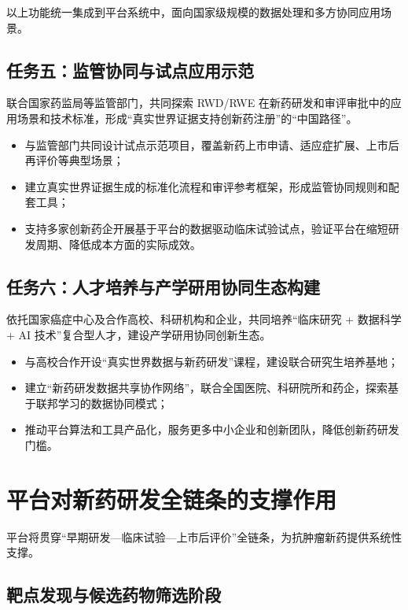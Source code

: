 \documentclass[12pt, a4paper, fontset=mac]{ctexart} %
\begin{document}
以上功能统一集成到平台系统中，面向国家级规模的数据处理和多方协同应用场景。

\subsection*{任务五：监管协同与试点应用示范}

联合国家药监局等监管部门，共同探索 RWD/RWE 在新药研发和审评审批中的应用场景和技术标准，形成“真实世界证据支持创新药注册”的“中国路径”。

\begin{itemize}
  \item 与监管部门共同设计试点示范项目，覆盖新药上市申请、适应症扩展、上市后再评价等典型场景；
  \item 建立真实世界证据生成的标准化流程和审评参考框架，形成监管协同规则和配套工具；
  \item 支持多家创新药企开展基于平台的数据驱动临床试验试点，验证平台在缩短研发周期、降低成本方面的实际成效。
\end{itemize}

\subsection*{任务六：人才培养与产学研用协同生态构建}

依托国家癌症中心及合作高校、科研机构和企业，共同培养“临床研究 + 数据科学 + AI 技术”复合型人才，建设产学研用协同创新生态。

\begin{itemize}
  \item 与高校合作开设“真实世界数据与新药研发”课程，建设联合研究生培养基地；
  \item 建立“新药研发数据共享协作网络”，联合全国医院、科研院所和药企，探索基于联邦学习的数据协同模式；
  \item 推动平台算法和工具产品化，服务更多中小企业和创新团队，降低创新药研发门槛。
\end{itemize}

\section{平台对新药研发全链条的支撑作用}

平台将贯穿“早期研发—临床试验—上市后评价”全链条，为抗肿瘤新药提供系统性支撑。

\subsection{靶点发现与候选药物筛选阶段}
\end{document}
